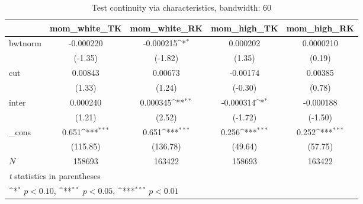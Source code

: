 \documentclass[a4paper,11pt]{article}
\begin{document}

\begin{table}[htbp]\centering
\def\sym#1{\ifmmode^{#1}\else\(^{#1}\)\fi}
\caption{Test continuity via characteristics, bandwidth: 60}
\label{A3.bw60}
\begin{tabular}{l*{4}{c}}
\hline\hline
            &\multicolumn{1}{c}{mom\_white\_TK}&\multicolumn{1}{c}{mom\_white\_RK}&\multicolumn{1}{c}{mom\_high\_TK}&\multicolumn{1}{c}{mom\_high\_RK}\\
\hline
bwtnorm     &   -0.000220         &   -0.000215\sym{*}  &    0.000202         &   0.0000210         \\
            &     (-1.35)         &     (-1.82)         &      (1.35)         &      (0.19)         \\
[1em]
cut         &     0.00843         &     0.00673         &    -0.00174         &     0.00385         \\
            &      (1.33)         &      (1.24)         &     (-0.30)         &      (0.78)         \\
[1em]
inter       &    0.000240         &    0.000345\sym{**} &   -0.000314\sym{*}  &   -0.000188         \\
            &      (1.21)         &      (2.52)         &     (-1.72)         &     (-1.50)         \\
[1em]
\_cons      &       0.651\sym{***}&       0.651\sym{***}&       0.256\sym{***}&       0.252\sym{***}\\
            &    (115.85)         &    (136.78)         &     (49.64)         &     (57.75)         \\
\hline
\(N\)       &      158693         &      163422         &      158693         &      163422         \\
\hline\hline
\multicolumn{5}{l}{\footnotesize \textit{t} statistics in parentheses}\\
\multicolumn{5}{l}{\footnotesize \sym{*} \(p<0.10\), \sym{**} \(p<0.05\), \sym{***} \(p<0.01\)}\\
\end{tabular}
\end{table}
\end{document}
